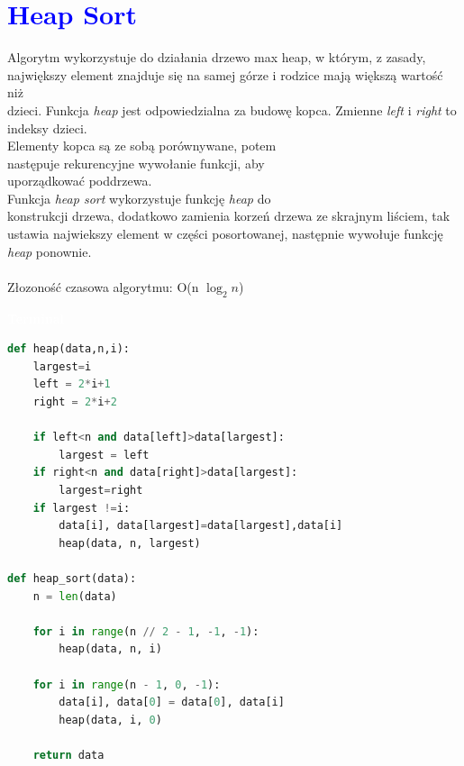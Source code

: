 \documentclass{article}
\begin{document}
	\newpage
	
	\section*{\textcolor{blue}{Heap Sort}}
	\begin{multicols}{2}
		\noindent Algorytm wykorzystuje do działania drzewo max heap, w którym, z zasady, największy element znajduje się na samej górze i rodzice mają większą wartość niż \\dzieci. Funkcja \textit{heap} jest odpowiedzialna za budowę kopca. Zmienne \textit{left} i \textit{right} to indeksy dzieci. \\Elementy kopca są ze sobą porównywane, potem \\następuje rekurencyjne wywołanie funkcji, aby \\uporządkować poddrzewa. \\
		Funkcja \textit{heap sort} wykorzystuje funkcję \textit{heap} do \\konstrukcji drzewa, dodatkowo zamienia korzeń drzewa ze skrajnym liściem, tak ustawia najwiekszy element w części posortowanej, następnie wywołuje funkcję \textit{heap} ponownie.\\ \\Złozoność czasowa algorytmu: O(n $\log_2 n$)
		
		\noindent 
		\begin{tcolorbox}[colback=black,colframe=gray!50!,arc=3mm,boxrule=0pt,left=0pt,right=0pt,width=\linewidth]
			\textcolor{white}{\textbf{\textsf{Terminal}}}\\
			
			\begin{lstlisting}[language=Python]
def heap(data,n,i):
	largest=i
	left = 2*i+1
	right = 2*i+2

	if left<n and data[left]>data[largest]:
		largest = left
	if right<n and data[right]>data[largest]:
		largest=right
	if largest !=i:
		data[i], data[largest]=data[largest],data[i]
		heap(data, n, largest)

def heap_sort(data):
	n = len(data)

	for i in range(n // 2 - 1, -1, -1):  
		heap(data, n, i)

	for i in range(n - 1, 0, -1):
		data[i], data[0] = data[0], data[i]
		heap(data, i, 0)

	return data
			\end{lstlisting}
			
		\end{tcolorbox}
	\end{multicols}
	
\end{document}
